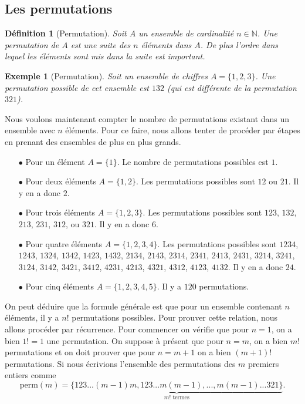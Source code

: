 \documentclass[a4paper,12pt]{book}
\renewcommand{\natural}{\mathbb{N}}
\newcommand{\perm}{\mathrm{perm}}
\newtheorem{definition}{Définition}
\newtheorem*{exemple}{Exemple}
\begin{document}
\subsection{Les permutations}

\begin{definition}[Permutation]
Soit $A$ un ensemble de cardinalité $n\in \natural$. Une permutation de $A$ est
une suite des $n$ éléments dans $A$. De plus l'ordre dans lequel les éléments 
sont mis dans la suite est important.
\end{definition}
\begin{exemple}[Permutation]
Soit un ensemble de chiffres $A=\{1,2,3\}$. Une permutation possible de cet ensemble est $132$ (qui est différente de la permutation $321$).
\end{exemple}
Nous voulons maintenant compter le nombre de permutations existant dans un ensemble avec $n$ éléments.
Pour ce faire, nous allons tenter de procéder par étapes en prenant des ensembles de plus en plus grands.
\begin{itemize}
 \item[$\bullet$] Pour un élément $A=\{1\}$. Le nombre de permutations possibles est $1$.
 \item[$\bullet$] Pour deux éléments $A=\{1,2\}$. Les permutations possibles sont $12$ ou $21$. Il y en a donc $2$.
 \item[$\bullet$] Pour trois éléments $A=\{1,2,3\}$. Les permutations possibles sont $123$, $132$, $213$, $231$, $312$, ou $321$. Il y en a donc $6$.
 \item[$\bullet$] Pour quatre éléments $A=\{1,2,3,4\}$. Les permutations possibles sont $1234$, $1243$, $1324$, $1342$, $1423$, $1432$, $2134$, $2143$, $2314$, $2341$, $2413$, $2431$,
 $3214$, $3241$, $3124$, $3142$, $3421$, $3412$, $4231$, $4213$, $4321$, $4312$, $4123$, $4132$. Il y en a donc $24$.
 \item[$\bullet$] Pour cinq éléments $A=\{1,2,3,4,5\}$. Il y a $120$ permutations.
\end{itemize}
On peut déduire que la formule générale est que pour un ensemble contenant $n$ éléments, il y a $n!$
permutations possibles. Pour prouver cette relation, nous allons procéder par récurrence.
Pour commencer on vérifie que pour $n=1$, on a bien $1!=1$ une permutation. On suppose à présent que pour $n=m$,
on a bien $m!$ permutations et on doit prouver que pour $n=m+1$ on a bien $(m+1)!$ permutations.
Si nous écrivions l'ensemble des permutations des $m$ premiers entiers comme
\begin{equation}
 \perm(m)=\underbrace{\{123...(m-1)m,123...m(m-1),...,m(m-1)...321\}}_{m!\textrm{ termes}}.\label{eq_permutations}
\end{equation}
\end{document}
